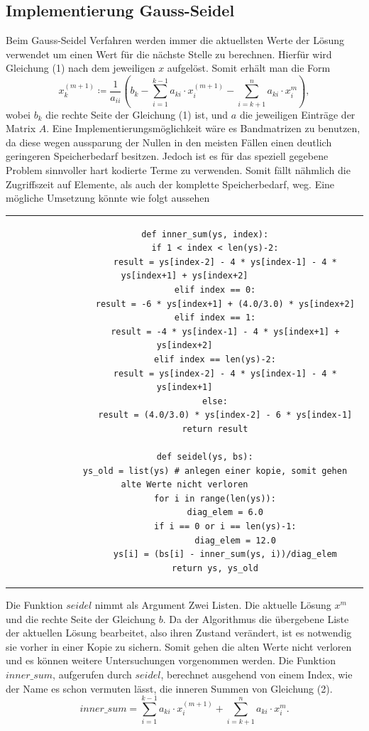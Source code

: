 \documentclass[12pt,titlepage]{article}
\begin{document}
	\subsection{Implementierung Gauss-Seidel}
		
		Beim Gauss-Seidel Verfahren werden immer die aktuellsten Werte der Lösung verwendet um einen Wert für die nächste Stelle zu berechnen. Hierfür wird Gleichung (1) nach dem jeweiligen $x$ aufgelöst. Somit erhält man die Form
		\begin{equation}
			x_{k}^{(m+1)} \coloneqq \frac{1}{a_{ii}}\left(b_{k} - \sum_{i=1}^{k-1}a_{ki}\cdot x_{i}^{(m+1)} - \sum_{i = k+1}^{n}a_{ki}\cdot x_{i}^m\right),
		\end{equation}
		wobei $b_k$ die rechte Seite der Gleichung (1) ist, und $a$ die jeweiligen Einträge der Matrix $A$.
		Eine Implementierungsmöglichkeit wäre es Bandmatrizen zu benutzen, da diese wegen aussparung der Nullen
		in den meisten Fällen einen deutlich geringeren Speicherbedarf besitzen. Jedoch ist es für das speziell gegebene Problem sinnvoller hart kodierte Terme zu verwenden. Somit fällt nähmlich die Zugriffszeit auf Elemente, als auch der komplette Speicherbedarf, weg. Eine mögliche Umsetzung könnte wie folgt aussehen \newline
		\newline
		\begin{tabular}{c}
		\begin{lstlisting}
		def inner_sum(ys, index):
		    if 1 < index < len(ys)-2:
		        result = ys[index-2] - 4 * ys[index-1] - 4 * ys[index+1] + ys[index+2]
		    elif index == 0:
		        result = -6 * ys[index+1] + (4.0/3.0) * ys[index+2]
		    elif index == 1:
		        result = -4 * ys[index-1] - 4 * ys[index+1] + ys[index+2]
		    elif index == len(ys)-2:
		        result = ys[index-2] - 4 * ys[index-1] - 4 * ys[index+1]
		    else:
		        result = (4.0/3.0) * ys[index-2] - 6 * ys[index-1]
		    return result
		    
		def seidel(ys, bs):
			ys_old = list(ys) # anlegen einer kopie, somit gehen alte Werte nicht verloren
		    for i in range(len(ys)):
		    	diag_elem = 6.0
		        if i == 0 or i == len(ys)-1:
		        	diag_elem = 12.0
		        ys[i] = (bs[i] - inner_sum(ys, i))/diag_elem
		    return ys, ys_old
	 	\end{lstlisting}
		\end{tabular}
		\newpage
		Die Funktion $seidel$ nimmt als Argument Zwei Listen. Die aktuelle Lösung  $x^m$ und die rechte Seite der Gleichung $b$. Da der Algorithmus die übergebene Liste der aktuellen Lösung bearbeitet, also ihren Zustand verändert, ist es notwendig sie vorher in einer Kopie zu sichern. Somit gehen die alten Werte nicht verloren
		und es können weitere Untersuchungen vorgenommen werden. Die Funktion $inner\_sum$, aufgerufen durch $seidel$, berechnet ausgehend von einem Index, wie der Name es schon vermuten lässt, die inneren Summen von Gleichung (2). 
		\begin{equation*}
			inner\_sum = \sum_{i=1}^{k-1}a_{ki}\cdot x_{i}^{(m+1)} + \sum_{i = k+1}^{n}a_{ki}\cdot x_{i}^m.
		\end{equation*}
		
\end{document}

